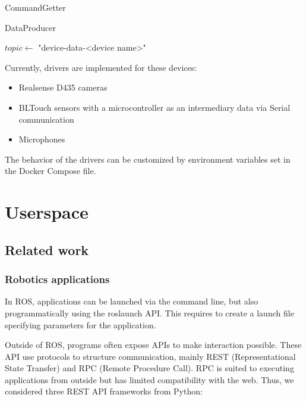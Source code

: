 \begin{algorithm}
  \caption{CommandGetter}
  \label{alg:command_getter}
\end{algorithm}

\begin{algorithm}
  \caption{DataProducer}
  \label{alg:data_producer}
  $topic\leftarrow$ "device-data-<device name>"\;
\end{algorithm}

Currently, drivers are implemented for these devices:
\begin{itemize}
  \item Realsense D435 cameras
  \item BLTouch sensors with a microcontroller as an intermediary data via Serial communication
  \item Microphones
\end{itemize}

The behavior of the drivers can be customized by environment variables set in the Docker Compose file.



\section{Userspace}


\subsection{Related work}

\subsubsection{Robotics applications}

In ROS, applications can be launched via the command line, but also programmatically using the roslaunch API. This requires to create a launch file specifying parameters for the application.

Outside of ROS, programs often expose APIs to make interaction possible. These API use protocols to structure communication, mainly REST (Representational State Transfer) and RPC (Remote Procedure Call). RPC is suited to executing applications from outside but has limited compatibility with the web. Thus, we considered three REST API frameworks from Python:

